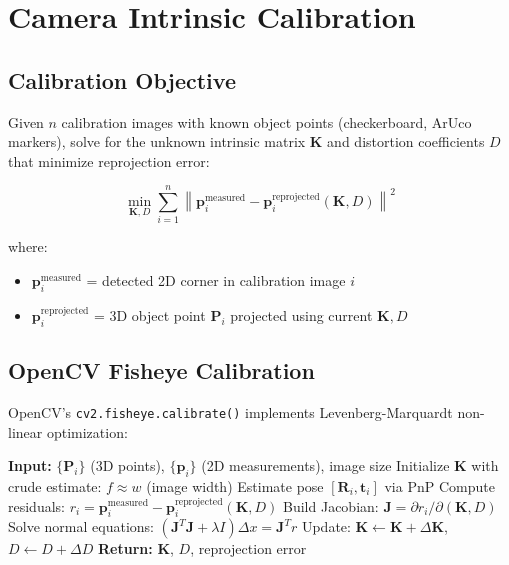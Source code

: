 \documentclass[11pt,a4paper,oneside]{article}
\begin{document}
\section{Camera Intrinsic Calibration}
\label{sec:calibration}

\subsection{Calibration Objective}

Given $n$ calibration images with known object points (checkerboard, ArUco markers), solve for the unknown intrinsic matrix $\mathbf{K}$ and distortion coefficients $D$ that minimize reprojection error:

\begin{equation}
\min_{\mathbf{K}, D} \sum_{i=1}^{n} \left\| \mathbf{p}_i^{\text{measured}} - \mathbf{p}_i^{\text{reprojected}}(\mathbf{K}, D) \right\|^2
\label{eq:calib_objective}
\end{equation}

where:
\begin{itemize}
    \item $\mathbf{p}_i^{\text{measured}}$ = detected 2D corner in calibration image $i$
    \item $\mathbf{p}_i^{\text{reprojected}}$ = 3D object point $\mathbf{P}_i$ projected using current $\mathbf{K}, D$
\end{itemize}

\subsection{OpenCV Fisheye Calibration}

OpenCV's \texttt{cv2.fisheye.calibrate()} implements Levenberg-Marquardt non-linear optimization:

\begin{algorithm}
\caption{Fisheye Calibration Algorithm}
\begin{algorithmic}[1]
\State \textbf{Input:} $\{\mathbf{P}_i\}$ (3D points), $\{\mathbf{p}_i\}$ (2D measurements), image size
\State Initialize $\mathbf{K}$ with crude estimate: $f \approx w$ (image width)
    \State Estimate pose $[\mathbf{R}_i, \mathbf{t}_i]$ via PnP
\EndFor
{}
    \State Compute residuals: $r_i = \mathbf{p}_i^{\text{measured}} - \mathbf{p}_i^{\text{reprojected}}(\mathbf{K}, D)$
    \State Build Jacobian: $\mathbf{J} = \partial r_i / \partial (\mathbf{K}, D)$
    \State Solve normal equations: $(\mathbf{J}^T \mathbf{J} + \lambda I) \Delta x = \mathbf{J}^T r$
    \State Update: $\mathbf{K} \leftarrow \mathbf{K} + \Delta \mathbf{K}$, $D \leftarrow D + \Delta D$
\EndWhile
\State \textbf{Return:} $\mathbf{K}$, $D$, reprojection error
\end{algorithmic}
\end{algorithm}
\end{document}
